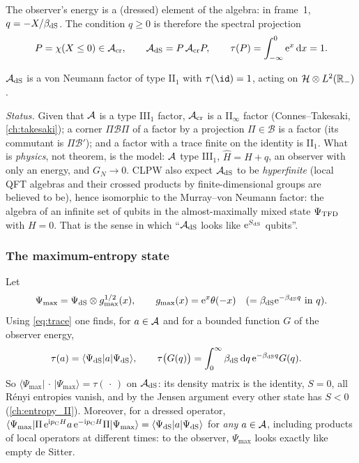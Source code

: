 The observer's energy is a (dressed) element of the algebra: in frame~1, $q=-X/\beta_{\rm dS}$. The condition $q\ge0$ is therefore the spectral projection
\begin{equation}
P=\chi(X\le0)\in\mathcal{A}_{\rm cr},\qquad\mathcal{A}_{\rm dS}=P\,\mathcal{A}_{\rm cr}P,\qquad\tau(P)=\int_{-\infty}^0\mathrm{e}^{x}\,\mathrm{d} x=1.\label{eq:trP}
\end{equation}
\begin{theorem}[CLPW]
$\mathcal{A}_{\rm dS}$ is a von Neumann factor of type II$_1$ with $\tau(\id)=1$, acting on $\mathcal{H}\otimes L^2(\mathbb{R}_-)$.
\end{theorem}
\emph{Status.} Given that $\mathcal{A}$ is a type III$_1$ factor, $\mathcal{A}_{\rm cr}$ is a II$_\infty$ factor (Connes--Takesaki, \cref{ch:takesaki}); a corner $\Pi\mathcal B\Pi$ of a factor by a projection $\Pi\in\mathcal B$ is a factor (its commutant is $\Pi\mathcal B'$); and a factor with a trace finite on the identity is II$_1$. What is \emph{physics}, not theorem, is the model: $\mathcal{A}$ type III$_1$, $\hat H=H+q$, an observer with only an energy, and $G_N\to0$. CLPW also expect $\mathcal{A}_{\rm dS}$ to be \emph{hyperfinite} (local QFT algebras and their crossed products by finite-dimensional groups are believed to be), hence isomorphic to the Murray--von Neumann factor: the algebra of an infinite set of qubits in the almost-maximally mixed state $\Psi_{\rm TFD}$ with $H=0$. That is the sense in which ``$\mathcal{A}_{\rm dS}$ looks like $\mathrm{e}^{S_{\rm dS}}$ qubits''.

\subsubsection*{The maximum-entropy state}
Let
\begin{equation}
\Psi_{\max}=\Psi_{\rm dS}\otimes g_{\max}^{1/2}(x),\qquad g_{\max}(x)=\mathrm{e}^{x}\theta(-x)\quad(=\beta_{\rm dS}\mathrm{e}^{-\beta_{\rm dS}q}\ \text{in }q).
\end{equation}
Using \eqref{eq:trace} one finds, for $a\in\mathcal{A}$ and for a bounded function $G$ of the observer energy,
\begin{align}
\tau(a)&=\langle\Psi_{\rm dS}|a|\Psi_{\rm dS}\rangle,\qquad
\tau\big(G(q)\big)=\int_0^\infty\beta_{\rm dS}\,\mathrm{d} q\,\mathrm{e}^{-\beta_{\rm dS}q}G(q).
\end{align}
So $\langle\Psi_{\max}|\,\cdot\,|\Psi_{\max}\rangle=\tau(\,\cdot\,)$ on $\mathcal{A}_{\rm dS}$: its density matrix is the identity, $S=0$, all R\'enyi entropies vanish, and by the Jensen argument every other state has $S<0$ (\cref{ch:entropy_II}). Moreover, for a dressed operator, $\langle\Psi_{\max}|\Pi\,\mathrm{e}^{\mathrm{i} p_{\rm C}H}a\,\mathrm{e}^{-\mathrm{i} p_{\rm C}H}\Pi|\Psi_{\max}\rangle=\langle\Psi_{\rm dS}|a|\Psi_{\rm dS}\rangle$ for \emph{any} $a\in\mathcal{A}$, including products of local operators at different times: to the observer, $\Psi_{\max}$ looks exactly like empty de Sitter.

